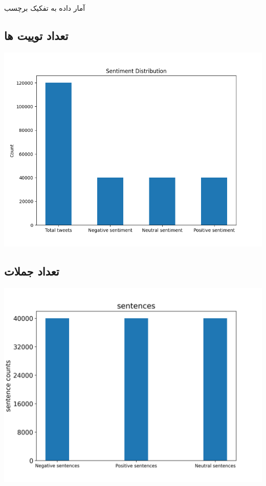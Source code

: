 \Section
{آمار داده به تفکیک برچسب}
{
	\subsection{تعداد توییت ها}
	{
		\selectfont \setLR
		\begin{center}
			\includegraphics[scale=0.75]{../stats/sentiment_distribution.png}
		\end{center}
		\begin{adjustbox}{width=\textwidth}
		\end{adjustbox}
	}
	\newpage
	\subsection{تعداد جملات}
	{
		\selectfont \setLR
		\begin{center}
			\includegraphics[scale=0.75]{../stats/sentences_for_each_label.png}
		\end{center}
		\begin{adjustbox}{width=\textwidth}
		\end{adjustbox}
	}
	\newpage
}
